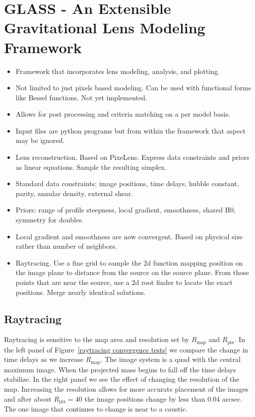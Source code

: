 \documentclass[onecolumn,galley]{mn2e}
\newcommand{\Rmap}{\ensuremath{R_\mathrm{map}}}
\newcommand{\Rpix}{\ensuremath{R_\mathrm{pix}}}
\newcommand{\figref}[1] {Figure~\ref{#1}}
\begin{document}
\section{GLASS - An Extensible Gravitational Lens Modeling Framework}
\label{GLASS Description}
\begin{itemize} 
\item Framework that incorporates lens modeling, analysis, and plotting.
\item Not limited to just pixels based modeling. Can be used with functional forms like Bessel functions. Not yet implemented.
\item Allows for post processing and criteria matching on a per model basis.
\item Input files are python programs but from within the framework that aspect may be ignored.

\item Lens reconstruction. Based on PixeLens. Express data constraints and
priors as linear equations. Sample the resulting simplex.
\item Standard data constraints: image positions, time delays, hubble constant, parity, annular density, external shear.
\item Priors: range of profile steepness, local gradient, smoothness, shared H0, symmetry for doubles.
\item Local gradient and smoothness are now convergent. Based on physical size rather than number of neighbors.

\item Raytracing. Use a fine grid to sample the 2d function mapping position on
the image plane to distance from the source on the source plane. From those
points that are near the source, use a 2d root finder to locate the exact
positions. Merge nearly identical solutions.

\end{itemize}

\subsection{Raytracing}
Raytracing is sensitive to the map area and resolution set by $\Rmap$ and
$\Rpix$.  In the left panel of \figref{raytracing convergence tests} we compare
the change in time delays as we increase $\Rmap$.  The image system is a quad
with the central maximum image. When the projected mass begins to fall off the
time delays stabilize. In the right panel we see the effect of changing the
resolution of the map.  Increasing the resolution allows for more accurate
placement of the images and after about $\Rpix=40$ the image positions change
by less than 0.04 arcsec. The one image that continues to change is near to a
caustic.  
\end{document}
